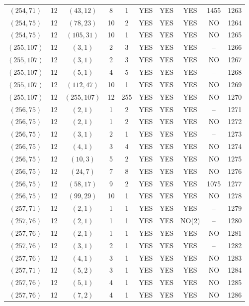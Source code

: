 \begin{longtable}{|c|c|c|c|c|c|c|c|c|c|}
$(254, 71)$ & 12 & $(43, 12)$ & 8 & 1 & YES & YES & YES & 1455 & 1263\\
$(254, 75)$ & 12 & $(78, 23)$ & 10 & 2 & YES & YES & YES & NO & 1264\\
$(254, 75)$ & 12 & $(105, 31)$ & 10 & 1 & YES & YES & YES & NO & 1265\\
$(255, 107)$ & 12 & $(3, 1)$ & 2 & 3 & YES & YES & YES & -- & 1266\\
$(255, 107)$ & 12 & $(3, 1)$ & 2 & 3 & YES & YES & YES & NO & 1267\\
$(255, 107)$ & 12 & $(5, 1)$ & 4 & 5 & YES & YES & YES & -- & 1268\\
$(255, 107)$ & 12 & $(112, 47)$ & 10 & 1 & YES & YES & YES & NO & 1269\\
$(255, 107)$ & 12 & $(255, 107)$ & 12 & 255 & YES & YES & YES & NO & 1270\\
$(256, 75)$ & 12 & $(2, 1)$ & 1 & 2 & YES & YES & YES & -- & 1271\\
$(256, 75)$ & 12 & $(2, 1)$ & 1 & 2 & YES & YES & YES & NO & 1272\\
$(256, 75)$ & 12 & $(3, 1)$ & 2 & 1 & YES & YES & YES & -- & 1273\\
$(256, 75)$ & 12 & $(4, 1)$ & 3 & 4 & YES & YES & YES & NO & 1274\\
$(256, 75)$ & 12 & $(10, 3)$ & 5 & 2 & YES & YES & YES & NO & 1275\\
$(256, 75)$ & 12 & $(24, 7)$ & 7 & 8 & YES & YES & YES & NO & 1276\\
$(256, 75)$ & 12 & $(58, 17)$ & 9 & 2 & YES & YES & YES & 1075 & 1277\\
$(256, 75)$ & 12 & $(99, 29)$ & 10 & 1 & YES & YES & YES & NO & 1278\\
$(257, 71)$ & 12 & $(2, 1)$ & 1 & 1 & YES & YES & YES & -- & 1279\\
$(257, 76)$ & 12 & $(2, 1)$ & 1 & 1 & YES & YES & NO(2) & -- & 1280\\
$(257, 76)$ & 12 & $(2, 1)$ & 1 & 1 & YES & YES & YES & NO & 1281\\
$(257, 76)$ & 12 & $(3, 1)$ & 2 & 1 & YES & YES & YES & -- & 1282\\
$(257, 76)$ & 12 & $(4, 1)$ & 3 & 1 & YES & YES & YES & NO & 1283\\
$(257, 71)$ & 12 & $(5, 2)$ & 3 & 1 & YES & YES & YES & NO & 1284\\
$(257, 76)$ & 12 & $(5, 1)$ & 4 & 1 & YES & YES & YES & NO & 1285\\
$(257, 76)$ & 12 & $(7, 2)$ & 4 & 1 & YES & YES & YES & NO & 1286\\

\end{longtable}
